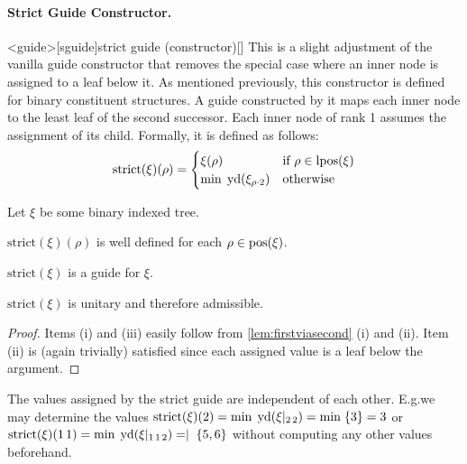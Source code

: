 \documentclass[../../document.tex]{subfiles}
\begin{document}
    \paragraph{Strict Guide Constructor.}<guide>[sguide]{strict guide (constructor)}[]
    This is a slight adjustment of the vanilla guide constructor that removes the special case where an inner node is assigned to a leaf below it.
    As mentioned previously, this constructor is defined for binary constituent structures.
    A guide constructed by it maps each inner node to the least leaf of the second successor.
    Each inner node of rank 1 assumes the assignment of its child.
    Formally, it is defined as follows:
    \[
    \mathrm{strict}(\xi)(\rho) = \begin{cases}
        \xi(\rho)   & \text{if $\rho \in \operatorname{lpos}(\xi)$}\\
        \min\;\operatorname{yd}(\xi_{\rho\cdot 2}) &\text{otherwise}
    \end{cases}
    \]

    \begin{theorem}
        Let \(\xi\) be some binary indexed tree.
        \begin{compactenum}
            \item \(\mathrm{strict}(\xi)(\rho)\) is well defined for each \(\rho \in \operatorname{pos}(\xi)\).
            \item \(\mathrm{strict}(\xi)\) is a guide for \(\xi\).
            \item \(\mathrm{strict}(\xi)\) is unitary and therefore admissible.
        \end{compactenum}
    \end{theorem}

    \begin{proof}
        Items (i) and (iii) easily follow from \cref{lem:firstviasecond} (i) and (ii).
        Item (ii) is (again trivially) satisfied since each assigned value is a leaf below the argument.
    \end{proof}

    \begin{example}
        The values assigned by the strict guide are independent of each other.
        E.g.\@ we may determine the values \(\mathrm{strict}(\xi)(2) = \min\;\operatorname{yd}(\xi|_{2\,2}) = \min\;\{3\} = 3\) or \(\mathrm{strict}(\xi)(1\,1) = \min\;\operatorname{yd}(\xi|_{1\,1\,2}) = \mid\;\{5,6\}\) without computing any other values beforehand.
    \end{example}
\end{document}
